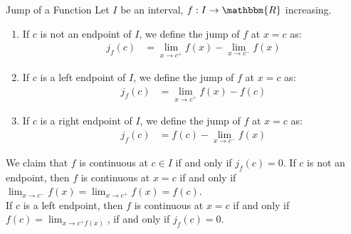 \documentclass[10pt]{extarticle}
\newcommand{\R}{\mathbbm{R}}
\begin{document}
  \begin{problem}{Jump of a Function}
    Let $I$ be an interval, $f: I\rightarrow \R$ increasing.
    \begin{enumerate}[(1)]
      \item If $c$ is not an endpoint of $I$, we define the jump of $f$ at $x=c$ as:
        \begin{align*}
          j_f(c) &= \lim_{x\rightarrow c^{+}}f(x) - \lim_{x\rightarrow c^{-}}f(x)
        \end{align*}
      \item If $c$ is a left endpoint of $I$, we define the jump of $f$ at $x=c$ as:
        \begin{align*}
          j_{f}(c) &= \lim_{x\rightarrow c^{+}}f(x) - f(c)
        \end{align*}
      \item If $c$ is a right endpoint of $I$, we define the jump of $f$ at $x=c$ as:
        \begin{align*}
          j_f(c) &= f(c) - \lim_{x\rightarrow c^{-}}f(x)
        \end{align*}
    \end{enumerate}
    We claim that $f$ is continuous at $c\in I$ if and only if $j_f(c) = 0$.
    \tcblower
    If $c$ is not an endpoint, then $f$ is continuous at $x=c$ if and only if $\lim_{x\rightarrow c^{-}}f(x) = \lim_{x\rightarrow c^{+}} f(x) = f(c) $.\\

    If $c$ is a left endpoint, then $f$ is continuous at $x=c$ if and only if $f(c) = \lim_{x\rightarrow c^{+}f(x)}$, if and only if $j_f(c) = 0$.
  \end{problem}
\end{document}
